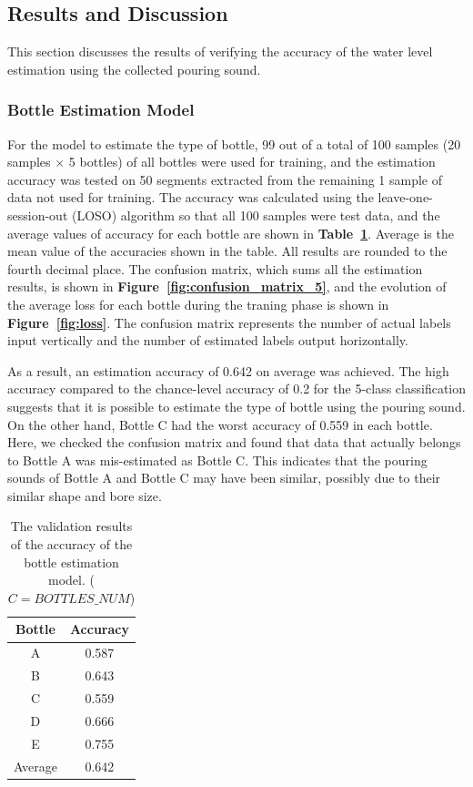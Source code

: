 \documentclass[sigconf]{acmart}
\newcommand\figref[1]{\textbf{Figure~\ref{fig:#1}}}
\newcommand\tabref[1]{\textbf{Table~\ref{tab:#1}}}
\begin{document}
\subsection{Results and Discussion}
This section discusses the results of verifying the accuracy of the water level estimation using the collected pouring sound.

\subsubsection{Bottle Estimation Model}
For the model to estimate the type of bottle, 99 out of a total of 100 samples (20 samples $\times$ 5 bottles) of all bottles were used for training, and the estimation accuracy was tested on 50 segments extracted from the remaining 1 sample of data not used for training. The accuracy was calculated using the leave-one-session-out (LOSO) algorithm so that all 100 samples were test data, and the average values of accuracy for each bottle are shown in \tabref{result_5}. Average is the mean value of the accuracies shown in the table. All results are rounded to the fourth decimal place. The confusion matrix, which sums all the estimation results, is shown in \figref{confusion_matrix_5}, and the evolution of the average loss for each bottle during the traning phase is shown in \figref{loss}. The confusion matrix represents the number of actual labels input vertically and the number of estimated labels output horizontally.\par

As a result, an estimation accuracy of 0.642 on average was achieved. The high accuracy compared to the chance-level accuracy of 0.2 for the 5-class classification suggests that it is possible to estimate the type of bottle using the pouring sound. On the other hand, Bottle C had the worst accuracy of 0.559 in each bottle. Here, we checked the confusion matrix and found that data that actually belongs to Bottle A was mis-estimated as Bottle C. This indicates that the pouring sounds of Bottle A and Bottle C may have been similar, possibly due to their similar shape and bore size.

\begin{table}[!t]
  \small
  \centering
  \caption{The validation results of the accuracy of the bottle estimation model. ($C=BOTTLES\_NUM$)}
  \begin{tabular}{c|c} \hline\hline
    Bottle & Accuracy \\ \hline
    A & 0.587 \\
    B & 0.643 \\
    C & 0.559 \\
    D & 0.666 \\
    E & 0.755 \\ \hline
    Average & 0.642 \\ \hline
  \end{tabular}
  \label{tab:result_5}
\end{table}
\end{document}
